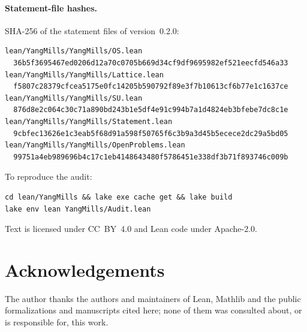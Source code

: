 \documentclass[11pt]{article}
\theoremstyle{definition}
\theoremstyle{remark}
\begin{document}
\paragraph{Statement-file hashes.} SHA-256 of the statement files of version~0.2.0:
\begin{Verbatim}
lean/YangMills/YangMills/OS.lean
  36b5f3695467ed0206d12a70c0705b669d34cf9df9695982ef521eecfd546a33
lean/YangMills/YangMills/Lattice.lean
  f5807c28379cfcea5175e0fc14205b590792f89e3f7b10613cf6b77e1c1637ce
lean/YangMills/YangMills/SU.lean
  876d8e2c064c30c71a890bd243b1e5df4e91c994b7a1d4824eb3bfebe7dc8c1e
lean/YangMills/YangMills/Statement.lean
  9cbfec13626e1c3eab5f68d91a598f50765f6c3b9a3d45b5ecece2dc29a5bd05
lean/YangMills/YangMills/OpenProblems.lean
  99751a4eb989696b4c17c1eb4148643480f5786451e338df3b71f893746c009b
\end{Verbatim}

To reproduce the audit:
\begin{Verbatim}
cd lean/YangMills && lake exe cache get && lake build
lake env lean YangMills/Audit.lean
\end{Verbatim}
Text is licensed under CC~BY~4.0 and Lean code under Apache-2.0.

\section*{Acknowledgements}
The author thanks the authors and maintainers of Lean, Mathlib and the public formalizations and
manuscripts cited here; none of them was consulted about, or is responsible for, this work.



\end{document}
